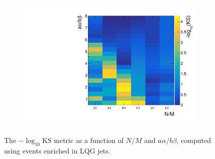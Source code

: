 \begin{figure}[]
    \begin{center}
        \begin{subfigure}[t]{0.4\textwidth}
            \includegraphics[width=\textwidth]{figures/toptagging/datamc/scanmnab.pdf}
        \end{subfigure}
        \caption{The $-\log_{10}\mathrm{KS}$ metric as a function of $N/M$ and $a\alpha/b\beta$, computed using events enriched in LQG jets. }
        \label{fig:jets:ks}
    \end{center}
\end{figure}


